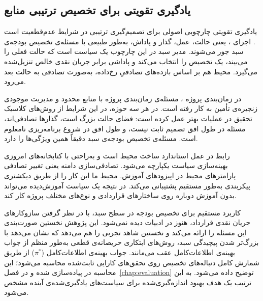 \subsection{یادگیری تقویتی برای تخصیص ترتیبی منابع}
\label{subsec:lr_rl}

یادگیری تقویتی چارچوبی اصولی برای تصمیم‌گیری ترتیبی در شرایط
عدم‌قطعیت است \citep{Sutton2018}.
اجزای ، یعنی حالت، عمل، گذار و پاداش، به‌طور طبیعی با
مسئله‌ی تخصیص بودجه‌ی سبد جور می‌شوند.
مدیر سبد در این چارچوب یک سیاست است که حالت فعلی را می‌بیند، یک
تخصیص را انتخاب می‌کند و پاداشی برابر جریان نقدی خالص تنزیل‌شده
می‌گیرد. محیط هم بر اساس بازده‌های تصادفیِ رخ‌داده، به‌صورت تصادفی
به حالت بعد می‌رود.

 در زمان‌بندی پروژه \citep{Peng2021, Liu2023}، مسئله‌ی
زمان‌بندی پروژه با منابع محدود \citep{Tassel2023} و مدیریت موجودی
زنجیره‌ی تأمین \citep{Giannoccaro2002} به کار رفته است.
در هر سه حوزه،  در این شرایط از روش‌های کلاسیک تحقیق در
عملیات بهتر عمل کرده است: فضای حالت بزرگ است، گذارها تصادفی‌اند،
مسئله در طول افق تصمیم ثابت نیست، و طول افق در شروع برنامه‌ریزی
نامعلوم است.
مسئله‌ی تخصیص بودجه‌ی سبد دقیقاً همین ویژگی‌ها را دارد.

رابط  \citep{Towers2024} در عمل استاندارد ساخت محیط
 است و به‌راحتی با کتابخانه‌های امروزی بهینه‌سازی سیاست
یکپارچه می‌شود.
تصادفی‌سازی دامنه \citep{Tobin2017} یعنی تغییر تصادفی پارامترهای
محیط در اپیزودهای آموزش. محیط ما این کار را از طریق دیکشنری
پیکربندی به‌طور مستقیم پشتیبانی می‌کند. در نتیجه یک سیاست آموزش‌دیده
می‌تواند بدون آموزش دوباره روی ساختارهای قراردادی و نوع‌های مختلف
پروژه کار کند.

کاربرد مستقیم  برای تخصیص بودجه در سطح سبد، با در نظر گرفتن
سازوکارهای جریان نقدی قرارداد، هنوز در ادبیات دیده نمی‌شود.
این پژوهش نخستین صورت‌بندی  این مسئله را ارائه می‌کند و
نخستین شاهد تجربی را هم می‌دهد که نشان می‌دهد با بزرگ‌تر شدن
پیچیدگی سبد، روش‌های ابتکاری حریصانه‌ی قطعی به‌طور منظم از جواب
بهینه‌ی اطلاعات‌کامل عقب می‌مانند. جواب بهینه‌ی اطلاعات‌کامل
($\pi^*$) از طریق شمارش کامل دنباله‌های تخصیص روی
تحقق‌های کارایی ثابت‌شده محاسبه می‌شود؛ این محاسبه در
 پیاده‌سازی شده و در فصل~\ref{chap:evaluation}
توضیح داده می‌شود. به این ترتیب یک هدف بهبود
اندازه‌گیری‌شده برای سیاست‌های یادگیری‌شده‌ی آینده مشخص می‌شود.

